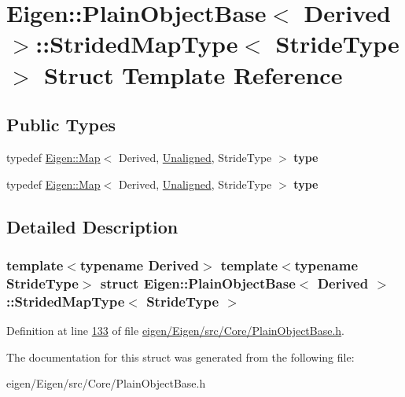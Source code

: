 \hypertarget{struct_eigen_1_1_plain_object_base_1_1_strided_map_type}{}\section{Eigen\+:\+:Plain\+Object\+Base$<$ Derived $>$\+:\+:Strided\+Map\+Type$<$ Stride\+Type $>$ Struct Template Reference}
\label{struct_eigen_1_1_plain_object_base_1_1_strided_map_type}
\subsection*{Public Types}
\begin{DoxyCompactItemize}
\item 
\mbox{\label{struct_eigen_1_1_plain_object_base_1_1_strided_map_type_a63eeb7d4d8aefb9904a7de79f640648e}} 
typedef \hyperlink{group___core___module_class_eigen_1_1_map}{Eigen\+::\+Map}$<$ Derived, \hyperlink{group__enums_gga45fe06e29902b7a2773de05ba27b47a1ac935220b4c844108e183ebe30a4d5204}{Unaligned}, Stride\+Type $>$ {\bfseries type}
\item 
\mbox{\label{struct_eigen_1_1_plain_object_base_1_1_strided_map_type_a63eeb7d4d8aefb9904a7de79f640648e}} 
typedef \hyperlink{group___core___module_class_eigen_1_1_map}{Eigen\+::\+Map}$<$ Derived, \hyperlink{group__enums_gga45fe06e29902b7a2773de05ba27b47a1ac935220b4c844108e183ebe30a4d5204}{Unaligned}, Stride\+Type $>$ {\bfseries type}
\end{DoxyCompactItemize}


\subsection{Detailed Description}
\subsubsection*{template$<$typename Derived$>$\newline
template$<$typename Stride\+Type$>$\newline
struct Eigen\+::\+Plain\+Object\+Base$<$ Derived $>$\+::\+Strided\+Map\+Type$<$ Stride\+Type $>$}



Definition at line \hyperlink{eigen_2_eigen_2src_2_core_2_plain_object_base_8h_source_l00133}{133} of file \hyperlink{eigen_2_eigen_2src_2_core_2_plain_object_base_8h_source}{eigen/\+Eigen/src/\+Core/\+Plain\+Object\+Base.\+h}.



The documentation for this struct was generated from the following file\+:\begin{DoxyCompactItemize}
\item 
eigen/\+Eigen/src/\+Core/\+Plain\+Object\+Base.\+h\end{DoxyCompactItemize}
